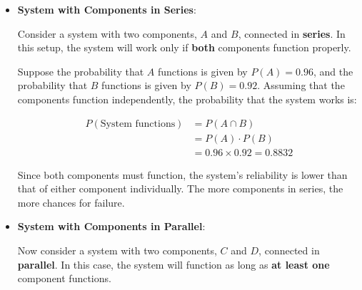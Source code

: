 \documentclass[twoside]{book}
\begin{document}
\begin{itemize}
    
\item \textbf{System with Components in Series}: 

Consider a system with two components, \( A \) and \( B \), connected in \textbf{series}. In this setup, the system will work only if \textbf{both} components function properly.

\begin{center}
\end{center}

Suppose the probability that $A$ functions is given by $P(A) = 0.96$, and the probability that $B$ functions is given by
$P(B) = 0.92$. Assuming that the components function independently, the probability that the system works is:

\[
\begin{aligned}
P(\text{System functions}) &= P(A \cap B) \\
&= P(A) \cdot P(B) \\
&= 0.96\times 0.92 = 0.8832
\end{aligned}
\]

Since both components must function, the system's reliability is lower than that of either component individually. The more components in series, the more chances for failure.

\item \textbf{System with Components in Parallel}:

Now consider a system with two components, \( C \) and \( D \), connected in \textbf{parallel}. In this case, the system will function as long as \textbf{at least one} component functions.

\begin{center}
\end{center}
\end{itemize}
\end{document}
